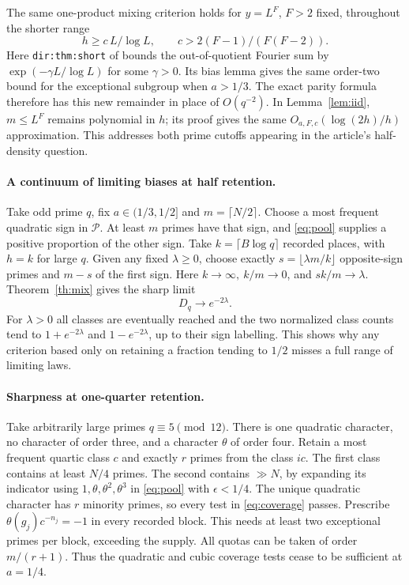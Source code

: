 \documentclass[11pt,letterpaper]{article}
\newcommand{\Pp}{\mathcal P}
\begin{document}
The same one-product mixing criterion holds for \(y=L^{F}\), \(F>2\) fixed, throughout the shorter range
\[
  h\ge c\,L/\log L,\qquad c>2(F-1)/(F(F-2)).
\]
Here \texttt{dir:thm:short} of \cite{article} bounds the out-of-quotient Fourier sum by \(\exp(-\gamma L/\log L)\) for some \(\gamma>0\). Its bias lemma gives the same order-two bound for the exceptional subgroup when \(a>1/3\). The exact parity formula therefore has this new remainder in place of \(O(q^{-2})\). In Lemma~\ref{lem:iid}, \(m\le L^F\) remains polynomial in \(h\); its proof gives the same \(O_{a,F,c}(\log(2h)/h)\) approximation. This addresses both prime cutoffs appearing in the article's half-density question.

\paragraph{A continuum of limiting biases at half retention.}
Take odd prime \(q\), fix \(a\in(1/3,1/2]\) and \(m=\lceil N/2\rceil\). Choose a most frequent quadratic sign in \(\Pp\). At least \(m\) primes have that sign, and \eqref{eq:pool} supplies a positive proportion of the other sign. Take \(k=\lceil B\log q\rceil\) recorded places, with \(h=k\) for large \(q\). Given any fixed \(\lambda\ge0\), choose exactly \(s=\lfloor\lambda m/k\rfloor\) opposite-sign primes and \(m-s\) of the first sign. Here \(k\to\infty,\ k/m\to0\), and \(sk/m\to\lambda\). Theorem~\ref{th:mix} gives the sharp limit
\[
                      D_q\longrightarrow e^{-2\lambda}.
\]
For \(\lambda>0\) all classes are eventually reached and the two normalized class counts tend to \(1+e^{-2\lambda}\) and \(1-e^{-2\lambda}\), up to their sign labelling. This shows why any criterion based only on retaining a fraction tending to \(1/2\) misses a full range of limiting laws.

\paragraph{Sharpness at one-quarter retention.}
Take arbitrarily large primes \(q\equiv5\pmod{12}\). There is one quadratic character, no character of order three, and a character \(\theta\) of order four. Retain a most frequent quartic class \(c\) and exactly \(r\) primes from the class \(ic\). The first class contains at least \(N/4\) primes. The second contains \(\gg N\), by expanding its indicator using \(1,\theta,\theta^2,\theta^3\) in \eqref{eq:pool} with \(\epsilon<1/4\). The unique quadratic character has \(r\) minority primes, so every test in \eqref{eq:coverage} passes. Prescribe \(\theta(g_j)c^{-n_j}=-1\) in every recorded block. This needs at least two exceptional primes per block, exceeding the supply. All quotas can be taken of order \(m/(r+1)\). Thus the quadratic and cubic coverage tests cease to be sufficient at \(a=1/4\).
\end{document}
